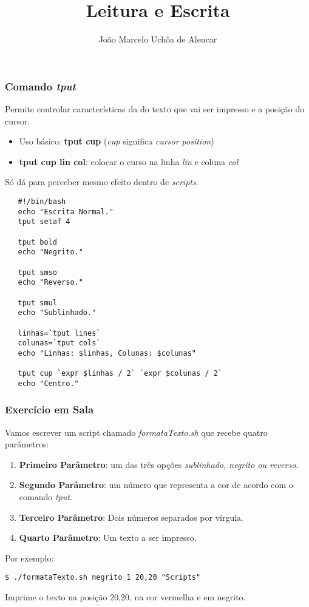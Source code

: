 \documentclass{beamer}
\title{Leitura e Escrita}
\author[João Marcelo Uchôa de Alencar]{João Marcelo Uchôa de Alencar}
\institute{Universidade Federal do Ceará - Quixadá}
\begin{document}
   \begin{frame}
      \titlepage
   \end{frame}

   \begin{frame}
      \frametitle{Comando \textit{tput}}
      Permite controlar características da do texto que vai ser impresso e a posição do cursor. \\
      \begin{itemize}
         \item Uso básico: \textbf{tput cup} (\textit{cup} significa \textit{cursor position})
	 \item \textbf{tput cup lin col}: colocar o curso na linha \textit{lin} e coluna \textit{col}
      \end{itemize}
      Só dá para perceber mesmo efeito dentro de \textit{scripts}.
   \end{frame}

   \begin{frame}[fragile]
   \begin{verbatim}
   #!/bin/bash
   echo "Escrita Normal."
   tput setaf 4

   tput bold
   echo "Negrito."

   tput smso
   echo "Reverso."

   tput smul
   echo "Sublinhado."

   linhas=`tput lines`
   colunas=`tput cols`
   echo "Linhas: $linhas, Colunas: $colunas"

   tput cup `expr $linhas / 2` `expr $colunas / 2`
   echo "Centro."
   \end{verbatim}
\end{frame}

   \begin{frame}[fragile]
      \frametitle{Exercício em Sala}
      Vamos escrever um script chamado \textit{formataTexto.sh} que recebe quatro parâmetros: 
      \begin{enumerate} 	     
         \item \textbf{Primeiro Parâmetro}: um das três opções \textit{sublinhado, negrito ou reverso}. 
         \item \textbf{Segundo Parâmetro}: um número que representa a cor de acordo com o comando \textit{tput}. 
         \item \textbf{Terceiro Parâmetro}: Dois números separados por vírgula. 
         \item \textbf{Quarto Parâmetro}: Um texto a ser impresso. 
      \end{enumerate}
      Por exemplo: 
      \begin{verbatim}
$ ./formataTexto.sh negrito 1 20,20 "Scripts"
      \end{verbatim}
      Imprime o texto na posição 20,20, na cor vermelha e em negrito.
\end{frame}
\end{document}
